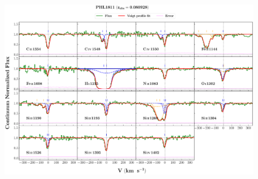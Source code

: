 \documentclass[12pt]{report}
\begin{document}
\newpage

\begin{landscape}

\begin{figure}
    \centering
    \vspace{-20mm}
    \hspace*{-35mm}
    \includegraphics[width=1.25\linewidth]{System-Plots/PHL1811_z=0.080928_sys_plot.png}
\end{figure}

\end{landscape}
\end{document}
